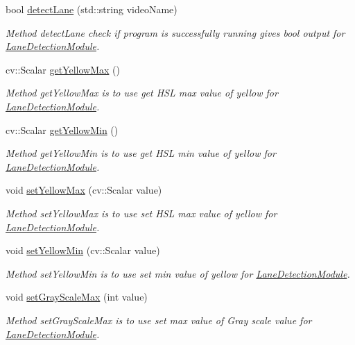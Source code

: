 \begin{DoxyCompactItemize}
bool \hyperlink{classLaneDetectionModule_a7b98ab6e8187993381f2c69b03ca76ef}{detect\+Lane} (std\+::string video\+Name)
\begin{DoxyCompactList}\small\item\em Method detect\+Lane check if program is successfully running gives bool output for \hyperlink{classLaneDetectionModule}{Lane\+Detection\+Module}. \end{DoxyCompactList}\item 
cv\+::\+Scalar \hyperlink{classLaneDetectionModule_a6623e87aa620c98c782c03392ce77def}{get\+Yellow\+Max} ()
\begin{DoxyCompactList}\small\item\em Method get\+Yellow\+Max is to use get H\+SL max value of yellow for \hyperlink{classLaneDetectionModule}{Lane\+Detection\+Module}. \end{DoxyCompactList}\item 
cv\+::\+Scalar \hyperlink{classLaneDetectionModule_a9b31a2a27534fdefbcfb2de841a893c2}{get\+Yellow\+Min} ()
\begin{DoxyCompactList}\small\item\em Method get\+Yellow\+Min is to use get H\+SL min value of yellow for \hyperlink{classLaneDetectionModule}{Lane\+Detection\+Module}. \end{DoxyCompactList}\item 
void \hyperlink{classLaneDetectionModule_a1f1d6d0bc111273b359db4ef289beef7}{set\+Yellow\+Max} (cv\+::\+Scalar value)
\begin{DoxyCompactList}\small\item\em Method set\+Yellow\+Max is to use set H\+SL max value of yellow for \hyperlink{classLaneDetectionModule}{Lane\+Detection\+Module}. \end{DoxyCompactList}\item 
void \hyperlink{classLaneDetectionModule_a6d6f42b5de704c711f0bdcf39173871b}{set\+Yellow\+Min} (cv\+::\+Scalar value)
\begin{DoxyCompactList}\small\item\em Method set\+Yellow\+Min is to use set min value of yellow for \hyperlink{classLaneDetectionModule}{Lane\+Detection\+Module}. \end{DoxyCompactList}\item 
void \hyperlink{classLaneDetectionModule_a36183171cc012f8444a995b718b22efc}{set\+Gray\+Scale\+Max} (int value)
\begin{DoxyCompactList}\small\item\em Method set\+Gray\+Scale\+Max is to use set max value of Gray scale value for \hyperlink{classLaneDetectionModule}{Lane\+Detection\+Module}. \end{DoxyCompactList}\item 

\end{DoxyCompactItemize}
